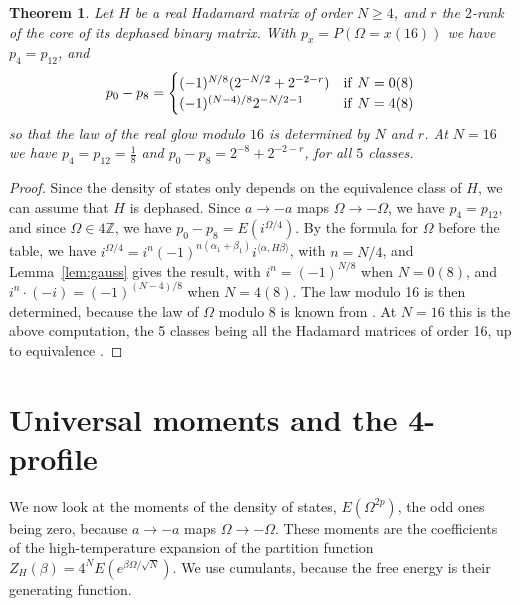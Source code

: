 \documentclass[11pt,a4paper]{article}
\newtheorem{thm}{Theorem}[section]
\theoremstyle{remark}
\begin{document}
\begin{samepage}
\begin{thm}\label{thm:2adic}
Let $H$ be a real Hadamard matrix of order $N\geq4$, and $r$ the $2$-rank of the core of its dephased binary matrix. With $p_x=P(\Omega=x(16))$ we have $p_4=p_{12}$, and
\[
 p_0-p_8=\begin{cases}
 (-1)^{N/8}(2^{-N/2}+2^{-2-r})&{\rm if}\ N=0(8)\\
 (-1)^{(N-4)/8}2^{-N/2-1}&{\rm if}\ N=4(8)
 \end{cases}
\]
so that the law of the real glow modulo $16$ is determined by $N$ and $r$. At $N=16$ we have $p_4=p_{12}=\frac{1}{8}$ and $p_0-p_8=2^{-8}+2^{-2-r}$, for all $5$ classes.
\end{thm}
\end{samepage}

\begin{proof}
Since the density of states only depends on the equivalence class of $H$, we can assume that $H$ is dephased. Since $a\to-a$ maps $\Omega\to-\Omega$, we have $p_4=p_{12}$, and since $\Omega\in4\mathbb Z$, we have $p_0-p_8=E(i^{\Omega/4})$. By the formula for $\Omega$ before the table, we have $i^{\Omega/4}=i^n(-1)^{n(\alpha_1+\beta_1)}i^{\langle\alpha,H\beta\rangle}$, with $n=N/4$, and Lemma~\ref{lem:gauss} gives the result, with $i^n=(-1)^{N/8}$ when $N=0(8)$, and $i^n\cdot(-i)=(-1)^{(N-4)/8}$ when $N=4(8)$. The law modulo 16 is then determined, because the law of $\Omega$ modulo 8 is known from \cite{ba1}. At $N=16$ this is the above computation, the 5 classes being all the Hadamard matrices of order 16, up to equivalence \cite{hal}.
\end{proof}

\section{Universal moments and the 4-profile}\label{sec:moments}

We now look at the moments of the density of states, $E(\Omega^{2p})$, the odd ones being zero, because $a\to-a$ maps $\Omega\to-\Omega$. These moments are the coefficients of the high-temperature expansion of the partition function $Z_H(\beta)=4^NE(e^{\beta\Omega/\sqrt N})$. We use cumulants, because the free energy is their generating function.

\medskip
\end{document}
